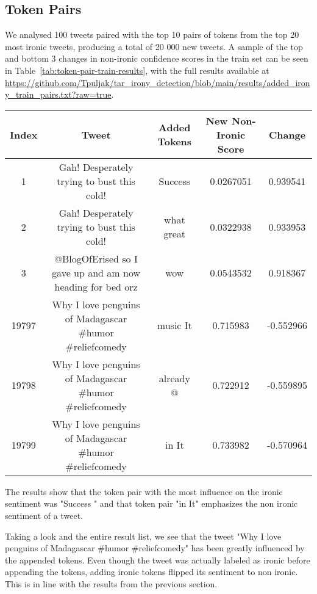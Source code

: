 \documentclass[10pt, a4paper]{article}
\begin{document}
\subsection{Token Pairs}

We analysed 100 tweets paired with the top 10 pairs of tokens from the top 20 most ironic tweets, producing a total of 20 000 new tweets.
A sample of the top and bottom 3 changes in non-ironic confidence scores in the train set can be seen in Table~\ref{tab:token-pair-train-results}, with the full results available at \url{https://github.com/Tpuljak/tar_irony_detection/blob/main/results/added_irony_train_pairs.txt?raw=true}.

\begin{table*}
\caption{Sample of Token Pair Results on the Train Set}
\label{tab:token-pair-train-results}
\begin{center}
\begin{tabular}{c|c|c|c|c}
\toprule
Index & Tweet & Added Tokens & New Non-Ironic Score & Change\\
\midrule
1     & Gah! Desperately trying to bust this cold!                & Success \textvisiblespace & 0.0267051 & 0.939541  \\
2     & Gah! Desperately trying to bust this cold!                & what great                & 0.0322938 & 0.933953  \\
3     & @BlogOfErised so I gave up and am now heading for bed orz & wow \textvisiblespace     & 0.0543532 & 0.918367  \\
19797 & Why I love penguins of Madagascar \#humor \#reliefcomedy  & music It                  & 0.715983  & -0.552966 \\
19798 & Why I love penguins of Madagascar \#humor \#reliefcomedy  & already @                 & 0.722912  & -0.559895 \\
19799 & Why I love penguins of Madagascar \#humor \#reliefcomedy  & in It                     & 0.733982  & -0.570964 \\
\bottomrule
\end{tabular}
\end{center}
\end{table*}

The results show that the token pair with the most influence on the ironic sentiment was "Success \textvisiblespace " and that token pair "in It" emphasizes the non ironic sentiment of a tweet.

Taking a look and the entire result list, we see that the tweet "Why I love penguins of Madagascar  \#humor \#reliefcomedy" has been greatly influenced by the appended tokens.
Even though the tweet was actually labeled as ironic before appending the tokens, adding ironic tokens flipped its sentiment to non ironic.
This is in line with the results from the previous section.
\end{document}
